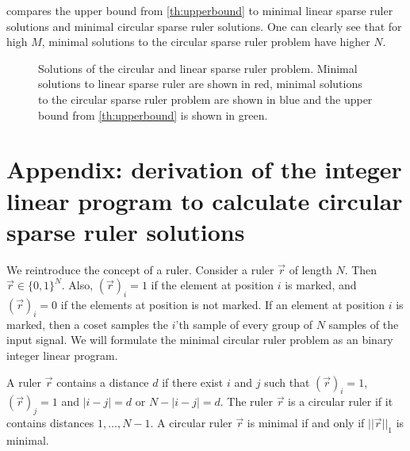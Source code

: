 \documentclass[a4paper, openany, oneside]{memoir}
\begin{document}
 compares the upper bound from \cref{th:upperbound} to minimal linear sparse ruler solutions and minimal circular sparse ruler solutions. One can clearly see that for high $M$, minimal solutions to the circular sparse ruler problem have higher $N$.
\begin{figure}[H]
\caption{Solutions of the circular and linear sparse ruler problem. Minimal solutions to linear sparse ruler are shown in red, minimal solutions to the circular sparse ruler problem are shown in blue and the upper bound from \cref{th:upperbound} is shown in green.}\label{fig:comparison_sparse_ruler}
\end{figure}


\section{Appendix: derivation of the integer linear program to calculate circular sparse ruler solutions}\label{ap:derivation_ILP}
We reintroduce the concept of a ruler. Consider a ruler $\vec{r}$ of length $N$. Then $\vec{r} \in \{0,1\}^N$. Also, $(\vec{r})_i = 1$ if the element at position $i$ is marked, and $(\vec{r})_i = 0$ if the elements at position is not marked. If an element at position $i$ is marked, then a coset samples the $i$'th sample of every group of $N$ samples of the input signal. We will formulate the minimal circular ruler problem as an binary integer linear program.

A ruler $\vec{r}$ contains a distance $d$ if there exist $i$ and $j$ such that $(\vec{r})_i = 1$, $(\vec{r})_j = 1$ and $|i-j| = d$ or  $N-|i-j| = d$. The ruler $\vec{r}$ is a circular ruler if it contains distances $ 1, \ldots, N - 1$. A circular ruler $\vec{r}$ is minimal if and only if $||\vec{r}||_1$ is minimal.
\end{document}
